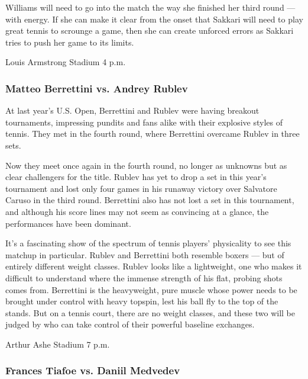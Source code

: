 Williams will need to go into the match the way she finished her third
round --- with energy. If she can make it clear from the onset that
Sakkari will need to play great tennis to scrounge a game, then she can
create unforced errors as Sakkari tries to push her game to its limits.

Louis Armstrong Stadium \textbar{} 4 p.m.

\hypertarget{matteo-berrettini-vs-andrey-rublev}{%
\subsubsection{\texorpdfstring{\textbf{Matteo Berrettini vs. Andrey
Rublev}}{Matteo Berrettini vs. Andrey Rublev}}\label{matteo-berrettini-vs-andrey-rublev}}

At last year's U.S. Open, Berrettini and Rublev were having breakout
tournaments, impressing pundits and fans alike with their explosive
styles of tennis. They met in the fourth round, where Berrettini
overcame Rublev in three sets.

Now they meet once again in the fourth round, no longer as unknowns but
as clear challengers for the title. Rublev has yet to drop a set in this
year's tournament and lost only four games in his runaway victory over
Salvatore Caruso in the third round. Berrettini also has not lost a set
in this tournament, and although his score lines may not seem as
convincing at a glance, the performances have been dominant.

It's a fascinating show of the spectrum of tennis players' physicality
to see this matchup in particular. Rublev and Berrettini both resemble
boxers --- but of entirely different weight classes. Rublev looks like a
lightweight, one who makes it difficult to understand where the immense
strength of his flat, probing shots comes from. Berrettini is the
heavyweight, pure muscle whose power needs to be brought under control
with heavy topspin, lest his ball fly to the top of the stands. But on a
tennis court, there are no weight classes, and these two will be judged
by who can take control of their powerful baseline exchanges.

Arthur Ashe Stadium \textbar{} 7 p.m.

\hypertarget{frances-tiafoe-vs-daniil-medvedev}{%
\subsubsection{\texorpdfstring{\textbf{Frances Tiafoe vs. Daniil
Medvedev}}{Frances Tiafoe vs. Daniil Medvedev}}\label{frances-tiafoe-vs-daniil-medvedev}}

